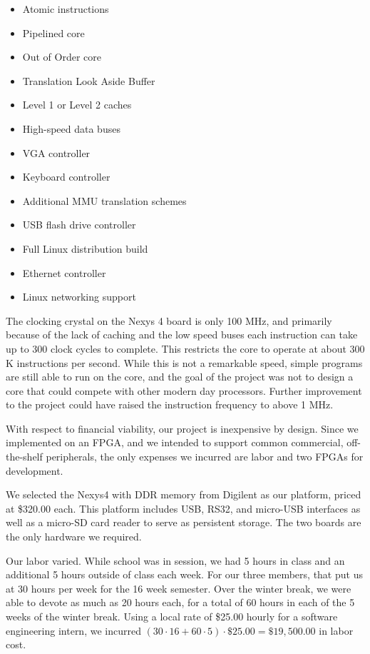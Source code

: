 \documentclass{article}
\begin{document}
\begin{itemize}
    \item Atomic instructions
    \item Pipelined core
    \item Out of Order core
    \item Translation Look Aside Buffer
    \item Level 1 or Level 2 caches
    \item High-speed data buses
    \item VGA controller
    \item Keyboard controller
    \item Additional MMU translation schemes
    \item USB flash drive controller
    \item Full Linux distribution build
    \item Ethernet controller
    \item Linux networking support

\end{itemize}

The clocking crystal on the Nexys 4 board is only 100 MHz, and primarily because of the lack of caching and the low speed buses each instruction can take up to 300 clock cycles to complete. This restricts the core to operate at about 300 K instructions per second. While this is not a remarkable speed, simple programs are still able to run on the core, and the goal of the project was not to design a core that could compete with other modern day processors. Further improvement to the project could have raised the instruction frequency to above 1 MHz.

With respect to financial viability, our project is inexpensive by design.  Since we implemented on an FPGA, and we intended to support common commercial, off-the-shelf peripherals, the only expenses we incurred are labor and two FPGAs for development.  

We selected the Nexys4 with DDR memory from Digilent as our platform, priced at \$320.00 each.  This platform includes USB, RS32, and micro-USB interfaces as well as a micro-SD card reader to serve as persistent storage.  The two boards are the only hardware we required.

Our labor varied.  While school was in session, we had 5 hours in class and an additional 5 hours outside of class each week.  For our three members, that put us at 30 hours per week for the 16 week semester.  Over the winter break, we were able to devote as much as 20 hours each, for a total of 60 hours in each of the 5 weeks of the winter break.  Using a local rate of \$25.00 hourly for a software engineering intern, we incurred $(30\cdot 16 + 60\cdot 5)\cdot \$25.00 = \$19,500.00$ in labor cost.
\end{document}
